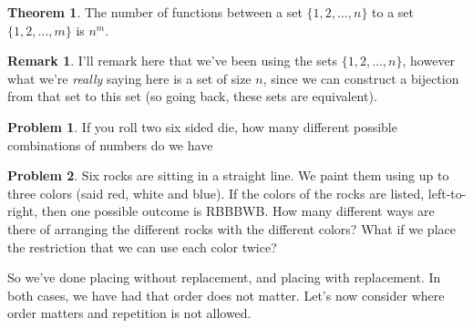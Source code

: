 \documentclass{book}
\theoremstyle{definition}
\newtheorem{problem}{Problem}
\numberwithin{problem}{chapter}
\numberwithin{solution}{chapter}
\newtheorem{theorem}{Theorem}
\numberwithin{theorem}{chapter}
\numberwithin{definition}{chapter}
\numberwithin{example}{chapter}
\newtheorem{remark}{Remark}
\numberwithin{remark}{chapter}
\numberwithin{claim}{chapter}
\numberwithin{fact}{chapter}
\numberwithin{preliminary}{chapter}
\numberwithin{corollary}{theorem}
\numberwithin{lemma}{chapter}
\numberwithin{proposition}{chapter}
\begin{document}
\begin{theorem}
The number of functions between a set $\{1,2,\ldots,n\}$ to a set $\{1,2,\ldots,m\}$ is $n^m$.
\end{theorem}

\begin{remark}
I'll remark here that we've been using the sets $\{1,2,\ldots,n\}$, however what we're \textit{really} saying here is a set of size $n$, since we can construct a bijection from that set to this set (so going back, these sets are equivalent).
\end{remark}

\begin{problem}
If you roll two six sided die, how many different possible combinations of numbers do we have
\end{problem}

\begin{problem}
Six rocks are sitting in a straight line. We paint them using up to three colors (said red, white and blue). If the colors of the rocks are listed, left-to-right, then one possible outcome is RBBBWB. How many different ways are there of arranging the different rocks with the different colors? What if we place the restriction that we can use each color twice?
\end{problem}

So we've done placing without replacement, and placing with replacement. In both cases, we have had that order does not matter. Let's now consider where order matters and repetition is not allowed.    


\printindex
\end{document}
